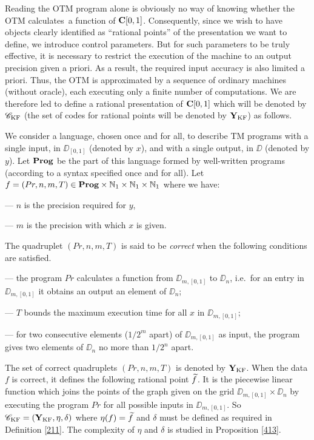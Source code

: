 \noindent 
Reading the OTM program alone is obviously no way of knowing whether the OTM calculates~a function of ${{\bf C}[0,1]}$. 
Consequently, since we wish to have objects clearly identified as ``rational points'' of the presentation we want to define, we introduce control parameters. 
But for such parameters to be truly effective, it is necessary to restrict the execution of the machine to an output precision given a priori. 
As a result, the required input accuracy is also limited a priori. 
Thus, the OTM is approximated by a sequence of ordinary machines (without oracle), each executing only a finite number of computations. 
We are therefore led to define a rational presentation of ${{\bf C}[0,1]}$ which will be denoted by ${{{\mathscr C}}_{\rm KF}}$ (the set of codes for rational points will be denoted by ${{\bf Y}_{\rm KF}}$) as follows.  
 
\begin{definition} \label{411}
We consider a language, chosen once and for all, to describe TM programs with a single input, in $\DD_{[0,1]}$ (denoted by $x$), and with a single output, in $\DD$ (denoted by $y$). Let ${\bf Prog}$ be the part of this language formed by well-written programs 
(according to a syntax specified once and for all).
Let $f = (Pr, n, m, T) \in {\bf Prog} \times \mathbb {N}_1 \times \mathbb {N}_1 
\times \mathbb {N}_1$ where we have:


\noindent 
--- $n$ is the precision required for $y$,

\noindent 
--- $m$ is the precision with which $x$ is given.

\noindent 
The quadruplet $(Pr,n,m,T)$ is said to be {\em correct} when the following conditions are satisfied.


\noindent 
--- the program $Pr$ calculates a function from $\DD_{m,[0,1]}$ to 
$\DD_n$, i.e.\ for an entry in $\DD_{m,[0,1]}$ it obtains an output 
an element of $\DD_n$;

\noindent 
--- $T$ bounds the maximum execution time for all $x$ in 
$\DD_{m,[0,1]}$; 

\noindent 
--- for two consecutive elements ($1/2^m$ apart) of 
$\DD_{m,[0,1]}$ as input, the program gives two elements of 
$\DD_n$ no more than $1/2^n$ apart.

\noindent \rdb 
The set of correct quadruplets $(Pr,n,m,T)$ is denoted by ${{\bf Y}_{\rm KF}}$\label{ykf}.
 When the data $f$ is correct, it defines the following rational point  
$\widetilde{f}$.
It is the piecewise linear function which joins the points of the graph given on the grid $\DD_{m,[0,1]} \times \DD_n$ by executing the program $Pr$ for all possible inputs in $\DD_{m,[0,1]}$.
So ${{{\mathscr C}}_{\rm KF}}=({{\bf Y}_{\rm KF}},\eta,\delta)$ where $\eta(f)=\widetilde f$ and $\delta$ must be defined as required in Definition \ref{211}. The complexity of $\eta$ and $\delta$ is studied in Proposition \ref{413}.
\end{definition} 

